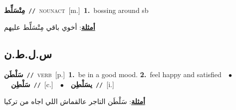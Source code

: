 \documentclass[10pt,a4paper,twoside]{article} %
\begin{document}
\begin{multicols}{2}
{\setlength\topsep{0pt}\textbf{\foreignlanguage{arabic}{مِتْسَلِّط}}\ {\color{gray}\texttt{//}\color{black}}\ \textsc{noun\textunderscore act}\ [m.]\ \textbf{1.}~bossing around sb\  \begin{flushright}\color{gray}\foreignlanguage{arabic}{\textbf{\underline{\foreignlanguage{arabic}{أمثلة}}}: أخوي باقي مِتْسَلِّط عليهم}\end{flushright}\color{black}} \vspace{2mm}

\vspace{-3mm}
\subsection*{\color{blue}\foreignlanguage{arabic}{س.ل.ط.ن}\color{blue}{}} 

{\setlength\topsep{0pt}\textbf{\foreignlanguage{arabic}{سَلْطَن}}\ {\color{gray}\texttt{//}\color{black}}\ \textsc{verb}\ [p.]\ \textbf{1.}~be in a good mood.  \textbf{2.}~feel happy and satisfied\ \ $\bullet$\ \ \setlength\topsep{0pt}\textbf{\foreignlanguage{arabic}{سَلْطِن}}\ {\color{gray}\texttt{//}\color{black}}\ [c.]\ \ $\bullet$\ \ \setlength\topsep{0pt}\textbf{\foreignlanguage{arabic}{يسَلْطِن}}\ {\color{gray}\texttt{//}\color{black}}\ [i.]\  \begin{flushright}\color{gray}\foreignlanguage{arabic}{\textbf{\underline{\foreignlanguage{arabic}{أمثلة}}}: سَلْطَن التاجر عالقماش اللي اجاه من تركيا}\end{flushright}\color{black}} \vspace{2mm}


\end{multicols}
\end{document}
